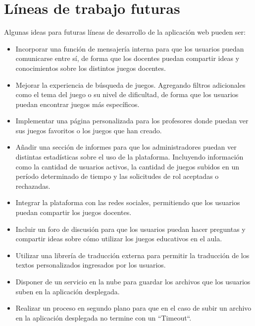 \section{Líneas de trabajo futuras}
Algunas ideas para futuras líneas de desarrollo de la aplicación web pueden ser:

\begin{itemize}
    \item Incorporar una función de mensajería interna para que los usuarios puedan comunicarse entre sí, de forma que los docentes puedan compartir ideas y conocimientos sobre los distintos juegos docentes.
    \item Mejorar la experiencia de búsqueda de juegos. Agregando filtros adicionales como el tema del juego o su nivel de dificultad, de forma que los usuarios puedan encontrar juegos más específicos.
    \item Implementar una página personalizada para los profesores donde puedan ver sus juegos favoritos o los juegos que han creado.
    \item Añadir una sección de informes para que los administradores puedan ver distintas estadísticas sobre el uso de la plataforma. Incluyendo información como la cantidad de usuarios activos, la cantidad de juegos subidos en un período determinado de tiempo y las solicitudes de rol aceptadas o rechazadas.
    \item Integrar la plataforma con las redes sociales, permitiendo que los usuarios puedan compartir los juegos docentes.
    \item Incluir un foro de discusión para que los usuarios puedan hacer preguntas y compartir ideas sobre cómo utilizar los juegos educativos en el aula.
    \item Utilizar una librería de traducción externa  para permitir la traducción de los textos personalizados ingresados por los usuarios.
    \item Disponer de un servicio en la nube para guardar los archivos que los usuarios suben en la aplicación desplegada.
    \item Realizar un proceso en segundo plano para que en el caso de subir un archivo en la aplicación desplegada no termine con un ``Timeout``.
\end{itemize}